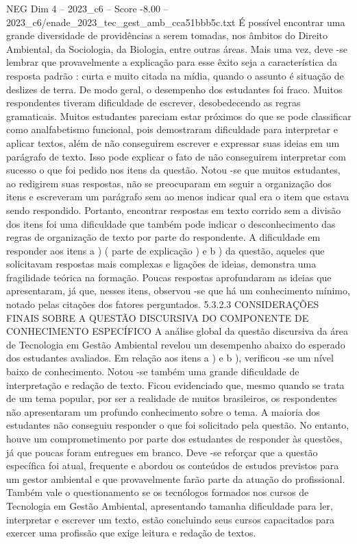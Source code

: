 \begin{textsample}{NEG Dim 4 – 2023\_c6 – Score -8.00 – 2023\_c6/enade\_2023\_tec\_gest\_amb\_cca51bbb5c.txt}
É possível encontrar uma grande diversidade de providências a serem tomadas, nos âmbitos do Direito Ambiental, da Sociologia, da Biologia, entre outras áreas.
Mais uma vez, deve -se lembrar que provavelmente a explicação para esse êxito seja a característica da resposta padrão : curta e muito citada na mídia, quando o assunto é situação de deslizes de terra.
De modo geral, o desempenho dos estudantes foi fraco.
Muitos respondentes tiveram dificuldade de escrever, desobedecendo as regras gramaticais.
Muitos estudantes pareciam estar próximos do que se pode classificar como analfabetismo funcional, pois demostraram dificuldade para interpretar e aplicar textos, além de não conseguirem escrever e expressar suas ideias em um parágrafo de texto.
Isso pode explicar o fato de não conseguirem interpretar com sucesso o que foi pedido nos itens da questão.
Notou -se que muitos estudantes, ao redigirem suas respostas, não se preocuparam em seguir a organização dos itens e escreveram um parágrafo sem ao menos indicar qual era o item que estava sendo respondido.
Portanto, encontrar respostas em texto corrido sem a divisão dos itens foi uma dificuldade que também pode indicar o desconhecimento das regras de organização de texto por parte do respondente.
A dificuldade em responder aos itens a ) ( parte de explicação ) e b ) da questão, aqueles que solicitavam respostas mais complexas e ligações de ideias, demonstra uma fragilidade teórica na formação.
Poucas respostas aprofundaram as ideias que apresentaram, já que, nesses itens, observou -se que há um conhecimento mínimo, notado pelas citações dos fatores perguntados. 5.3.2.3 CONSIDERAÇÕES FINAIS SOBRE A QUESTÃO DISCURSIVA DO COMPONENTE DE CONHECIMENTO ESPECÍFICO A análise global da questão discursiva da área de Tecnologia em Gestão Ambiental revelou um desempenho abaixo do esperado dos estudantes avaliados.
Em relação aos itens a ) e b ), verificou -se um nível baixo de conhecimento.
Notou -se também uma grande dificuldade de interpretação e redação de texto.
Ficou evidenciado que, mesmo quando se trata de um tema popular, por ser a realidade de muitos brasileiros, os respondentes não apresentaram um profundo conhecimento sobre o tema.
A maioria dos estudantes não conseguiu responder o que foi solicitado pela questão.
No entanto, houve um comprometimento por parte dos estudantes de responder às questões, já que poucas foram entregues em branco.
Deve -se reforçar que a questão específica foi atual, frequente e abordou os conteúdos de estudos previstos para um gestor ambiental e que provavelmente farão parte da atuação do profissional.
Também vale o questionamento se os tecnólogos formados nos cursos de Tecnologia em Gestão Ambiental, apresentando tamanha dificuldade para ler, interpretar e escrever um texto, estão concluindo seus cursos capacitados para exercer uma profissão que exige leitura e redação de textos.

\end{textsample}
